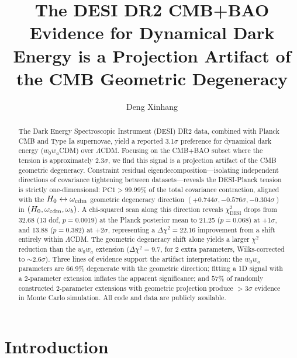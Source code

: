 \documentclass[12pt,preprint]{aastex631}
\begin{document}
\title{The DESI DR2 CMB+BAO Evidence for Dynamical Dark Energy is a Projection Artifact of the CMB Geometric Degeneracy}

\author{Deng Xinhang}

\begin{abstract}
The Dark Energy Spectroscopic Instrument (DESI) DR2 data, combined with Planck CMB and Type Ia supernovae, yield a reported $3.1\sigma$ preference for dynamical dark energy ($w_0 w_a$CDM) over $\Lambda$CDM. Focusing on the CMB+BAO subset where the tension is approximately $2.3\sigma$, we find this signal is a projection artifact of the CMB geometric degeneracy. Constraint residual eigendecomposition---isolating independent directions of covariance tightening between datasets---reveals the DESI-Planck tension is strictly one-dimensional: $\mathrm{PC1} > 99.99\%$ of the total covariance contraction, aligned with the $H_0 \leftrightarrow \omega_{\rm cdm}$ geometric degeneracy direction $(+0.744\sigma, -0.576\sigma, -0.304\sigma)$ in $(H_0, \omega_{\rm cdm}, \omega_b)$. A chi-squared scan along this direction reveals $\chi^2_{\mathrm{DESI}}$ drops from 32.68 (13 dof, $p=0.0019$) at the Planck posterior mean to 21.25 ($p=0.068$) at $+1\sigma$, and 13.88 ($p=0.382$) at $+2\sigma$, representing a $\Delta\chi^2 = 22.16$ improvement from a shift entirely within $\Lambda$CDM. The geometric degeneracy shift alone yields a larger $\chi^2$ reduction than the $w_0 w_a$ extension ($\Delta\chi^2 = 9.7$, for 2 extra parameters, Wilks-corrected to $\sim 2.6\sigma$). Three lines of evidence support the artifact interpretation: the $w_0 w_a$ parameters are $66.9\%$ degenerate with the geometric direction; fitting a 1D signal with a 2-parameter extension inflates the apparent significance; and $57\%$ of randomly constructed 2-parameter extensions with geometric projection produce $>3\sigma$ evidence in Monte Carlo simulation. All code and data are publicly available.
\end{abstract}


\section{Introduction}
\label{sec:intro}
\end{document}
